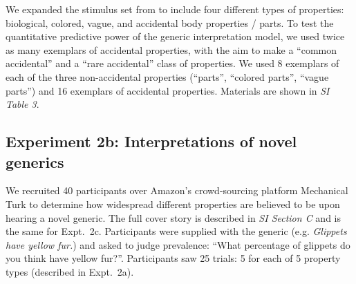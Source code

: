 \documentclass{pnastwo}
\begin{document}
\begin{article}
\begin{materials}
We expanded the stimulus set from \cite{Cimpian2010} to include four different types of properties: biological, colored, vague, and accidental body properties / parts. 
To test the quantitative predictive power of the generic interpretation model, we used twice as many exemplars of accidental properties, with the aim to make a ``common accidental'' and a ``rare accidental'' class of properties. 
We used 8 exemplars of each of the three non-accidental properties (``parts'', ``colored parts'', ``vague parts'') and 16 exemplars of accidental properties.
Materials are shown in {\it SI Table 3}.

\subsection{Experiment 2b: Interpretations of novel generics}
We recruited 40 participants over Amazon's crowd-sourcing platform Mechanical Turk to determine how widespread different properties are believed to be upon hearing a novel generic.  
The full cover story is described in {\it SI Section C} and is the same for Expt.~2c.
Participants were supplied with the generic (e.g. \emph{Glippets have yellow fur.}) and asked to judge prevalence: ``What percentage of glippets do you think have yellow fur?''. 
Participants saw 25 trials: 5 for each of 5 property types (described in Expt.~2a).

\end{materials}
\end{article}
\end{document}
